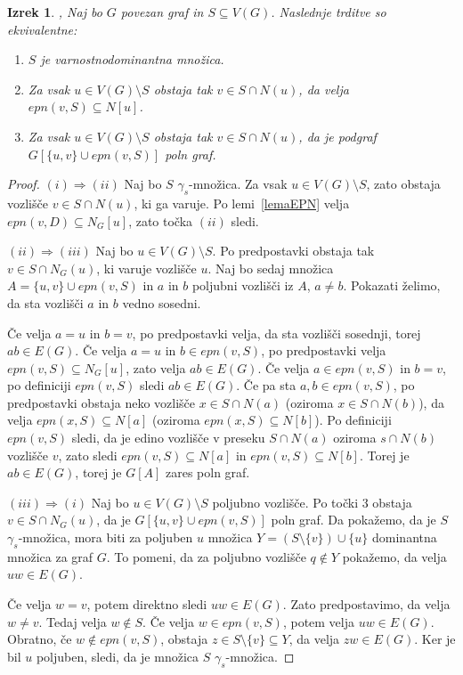 \documentclass[12pt,a4paper,twoside]{article}
\theoremstyle{definition} %
\theoremstyle{plain} %
\newtheorem{izrek}[definicija]{Izrek}
\numberwithin{equation}{section}  %
\begin{document}
\begin{izrek}\label{theorem3.1}{\rm{\cite[Proposition 2]{cockayne2005protection}}},{\rm{\cite[Theorem 2.2]{castillano2014secure}}}
Naj bo $G$ povezan graf in $S \subseteq V(G)$. Naslednje trditve so ekvivalentne:
\begin{enumerate}[label=(\roman*)]
\item $S$ je varnostnodominantna množica.
\item Za vsak $u \in V(G) \setminus S$ obstaja tak $v \in S \cap N(u)$, da velja $epn(v,S) \subseteq N[u]$.
\item Za vsak $u \in V(G) \setminus S$ obstaja tak $v \in S \cap N(u)$, da je podgraf $G[\{u,v\} \cup epn(v,S)]$ poln graf.
\end{enumerate}
\end{izrek}

\begin{proof}
$(i) \Rightarrow (ii)$ Naj bo $S$ $\gamma_s$-množica. Za vsak $u \in V(G) \setminus S$, zato obstaja vozlišče $v \in S \cap N(u)$, ki ga varuje. Po lemi~\ref{lemaEPN} velja  $epn(v, D) \subseteq N_G[u]$, zato točka $(ii)$ sledi.

\medskip
$(ii) \Rightarrow (iii)$ Naj bo $u \in V(G) \setminus S$. Po predpostavki obstaja tak $v \in S \cap N_G(u)$, ki varuje vozlišče $u$. Naj bo sedaj množica $A=\{u, v\} \cup epn(v, S)$ in $a$ in $b$ poljubni vozlišči iz $A$, $a \neq b$. Pokazati želimo, da sta vozlišči $a$ in $b$ vedno sosedni. 

\medskip
Če velja $a=u$ in $b=v$, po predpostavki velja, da sta vozlišči sosednji, torej $ab \in E(G)$. Če velja $a=u$ in $b \in epn(v, S)$, po predpostavki velja $epn(v, S) \subseteq N_G[u]$, zato velja $ab \in E(G)$. Če velja $a\in epn(v, S)$ in $b=v$, po definiciji $epn(v, S)$ sledi $ab \in E(G)$. Če pa sta $a,b \in epn(v, S)$, po predpostavki obstaja neko vozlišče  $x \in S \cap N(a)$ (oziroma $x \in S \cap N(b)$), da velja $epn(x,S) \subseteq N[a]$ (oziroma $epn(x,S) \subseteq N[b]$). Po definiciji $epn(v,S)$ sledi, da je edino vozlišče v preseku $S \cap N(a)$ oziroma $s \cap N(b)$ vozlišče $v$, zato sledi  $epn(v,S) \subseteq N[a]$ in $epn(v,S) \subseteq N[b]$. Torej je $ab \in E(G)$, torej je $G[A]$ zares poln graf.

\medskip
$(iii) \Rightarrow (i)$ Naj bo $u \in V(G) \setminus S$ poljubno vozlišče. Po točki 3 obstaja $v \in S \cap N_G(u)$, da je $G[\{u,v\} \cup epn(v,S)]$ poln graf. Da pokažemo, da je $S$ $\gamma_s$-množica, mora biti za poljuben $u$ množica $Y = (S \setminus \{v\}) \cup \{u\}$  dominantna množica za graf $G$. To pomeni, da za poljubno vozlišče $q \not\in Y$ pokažemo, da velja $uw \in E(G)$. 

Če velja $w=v$, potem direktno sledi $uw \in E(G)$.  Zato predpostavimo, da velja $w \neq v$. Tedaj velja $w \not\in S$. Če velja $w \in epn(v,S)$, potem velja $uw \in E(G)$. Obratno, če $w\not\in epn(v, S)$, obstaja $z \in S \setminus \{v\} \subseteq Y$, da velja $zw \in E(G)$.
Ker je bil $u$ poljuben, sledi, da je množica $S$ $\gamma_s$-množica.
\end{proof}
\end{document}
